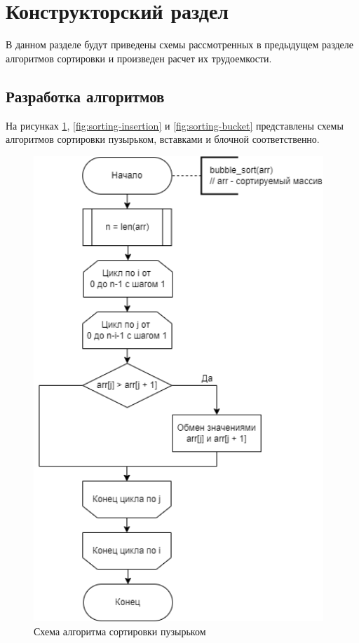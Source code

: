 \section{Конструкторский раздел}
В данном разделе будут приведены схемы рассмотренных в предыдущем разделе алгоритмов сортировки и произведен расчет их трудоемкости.

\subsection{Разработка алгоритмов}

На рисунках  \ref{fig:sorting-bubble}, \ref{fig:sorting-insertion} и \ref{fig:sorting-bucket} представлены схемы алгоритмов сортировки пузырьком, вставками и блочной соответственно.
\clearpage

\begin{figure}[h!btp]
	\centering
	\includegraphics[width=310pt]{inc/sorting-bubble.png}
	\caption{Схема алгоритма сортировки пузырьком}
	\label{fig:sorting-bubble}	
\end{figure}
\clearpage

